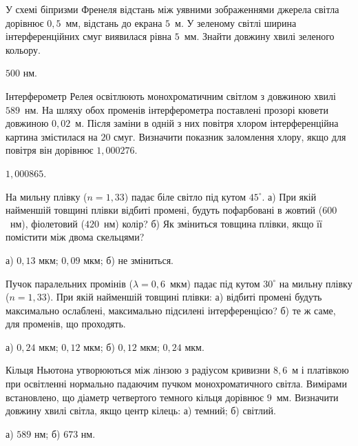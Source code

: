 \begin{problem}%
У схемі біпризми Френеля відстань між уявними зображеннями
джерела світла дорівнює $0,5$~мм, відстань до екрана $5$~м. У зеленому
світлі ширина інтерференційних смуг виявилася рівна $5$~мм. Знайти
довжину хвилі зеленого кольору.
\begin{solution}
	$ 500 $ нм.
\end{solution}
\end{problem}



\begin{problem}%
Інтерферометр Релея освітлюють монохроматичним світлом з
довжиною хвилі $589$~нм. На шляху обох променів інтерферометра
поставлені прозорі кювети довжиною $0,02$~м. Після заміни в одній з них
повітря хлором інтерференційна картина змістилася на $20$ смуг.
Визначити показник заломлення хлору, якщо для повітря він дорівнює
$1,000276$.
\begin{solution}
	$ 1,000865 $.
\end{solution}
\end{problem}


\begin{problem}%
На мильну плівку ($n = 1,33$) падає біле світло під кутом $45^\circ$. а) При
якій найменшій товщині плівки відбиті промені, будуть пофарбовані в
жовтий ($600$~нм), фіолетовий ($420$~нм) колір? б) Як зміниться товщина
плівки, якщо її помістити між двома скельцями?
\begin{solution}
	а) $ 0,13 $ мкм; $ 0,09 $ мкм; б) не зміниться.
\end{solution}
\end{problem}


\begin{problem}%
Пучок паралельних промінів ($\lambda = 0,6$~мкм) падає під кутом $30^\circ$ на
мильну плівку ($ n = 1,33 $). При якій найменшій товщині плівки: а) відбиті
промені будуть максимально ослаблені, максимально підсилені
інтерференцією? б) те ж саме, для променів, що проходять.
\begin{solution}
	а) $ 0,24 $ мкм; $ 0,12 $ мкм; б) $ 0,12 $ мкм; $ 0,24 $ мкм.
\end{solution}
\end{problem}


\begin{problem}%
Кільця Ньютона утворюються між лінзою з радіусом кривизни $ 8,6 $~м і
платівкою при освітленні нормально падаючим пучком
монохроматичного світла. Вимірами встановлено, що діаметр
четвертого темного кільця дорівнює $ 9 $~мм. Визначити довжину хвилі
світла, якщо центр кілець: а) темний; б) світлий.
\begin{solution}
	а) $ 589 $ нм; б) $ 673 $ нм.
\end{solution}
\end{problem}


